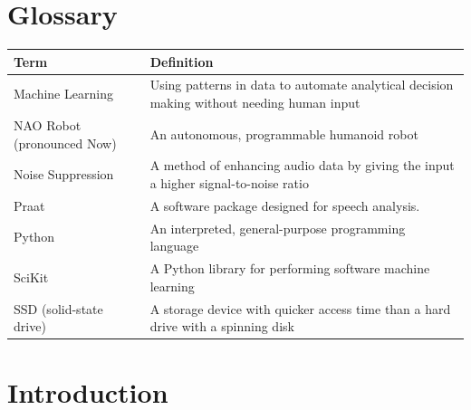 \documentclass[onecolumn, draftclsnofoot,10pt, compsoc]{IEEEtran}
\begin{document}
\newpage
{}
\tableofcontents
\clearpage

\section{Glossary}
\vspace{.3cm}
\begin{tabularx}{\linewidth}{l|X}
\textbf{Term} & \textbf{Definition} \\ \hline
Machine Learning & Using patterns in data to automate analytical decision making without needing human input \\ \hline
NAO Robot (pronounced Now) & An autonomous, programmable humanoid robot \\ \hline
Noise Suppression & A method of enhancing audio data by giving the input a higher signal-to-noise ratio \\ \hline
Praat & A software package designed for speech analysis. \\ \hline                                 
Python & An interpreted, general-purpose programming language \\ \hline                                 
SciKit & A Python library for performing software machine learning \\ \hline                              
SSD (solid-state drive) & A storage device with quicker access time than a hard drive with a spinning disk \\ \hline                              
\end{tabularx}
\vspace{.2cm}

\section{Introduction}
\end{document}

